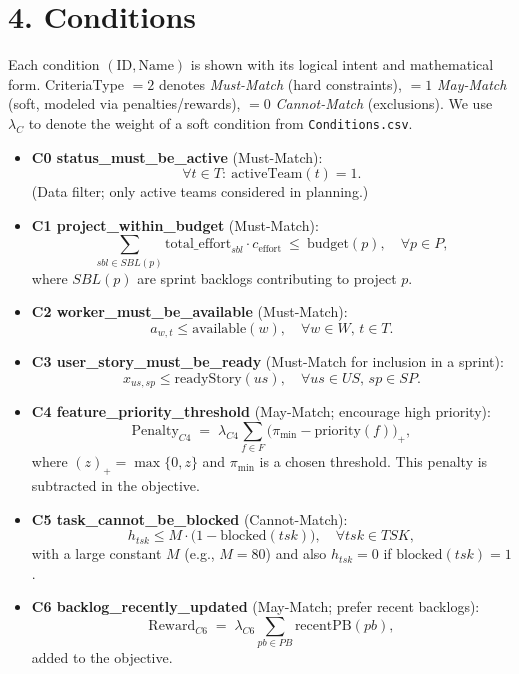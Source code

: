 \documentclass[11pt,a4paper]{article}
\begin{document}
\section{4. Conditions}
Each condition \((\text{ID}, \text{Name})\) is shown with its logical intent and mathematical form. CriteriaType \(=2\) denotes \emph{Must-Match} (hard constraints), \(=1\) \emph{May-Match} (soft, modeled via penalties/rewards), \(=0\) \emph{Cannot-Match} (exclusions). We use \(\lambda_C\) to denote the weight of a soft condition from \texttt{Conditions.csv}.

\begin{itemize}[leftmargin=2em,label=\(\triangleright\)]
  \item \textbf{C0 status\_must\_be\_active} (Must-Match):
  \[
  \forall t \in T:\ \text{activeTeam}(t)=1.
  \]
  (Data filter; only active teams considered in planning.)

  \item \textbf{C1 project\_within\_budget} (Must-Match):
  \[
  \sum_{sbl \in SBL(p)} \text{total\_effort}_{sbl} \cdot c_{\text{effort}} \ \le\ \text{budget}(p),\quad \forall p \in P,
  \]
  where \(SBL(p)\) are sprint backlogs contributing to project \(p\).

  \item \textbf{C2 worker\_must\_be\_available} (Must-Match):
  \[
  a_{w,t} \le \text{available}(w),\quad \forall w \in W,\, t \in T.
  \]

  \item \textbf{C3 user\_story\_must\_be\_ready} (Must-Match for inclusion in a sprint):
  \[
  x_{us,sp} \le \text{readyStory}(us),\quad \forall us \in US,\, sp \in SP.
  \]

  \item \textbf{C4 feature\_priority\_threshold} (May-Match; encourage high priority):
  \[
  \text{Penalty}_{C4} \;=\; \lambda_{C4}\!\!\sum_{f \in F}\! \big(\pi_{\min} - \text{priority}(f)\big)_+,
  \]
  where \((z)_+=\max\{0,z\}\) and \(\pi_{\min}\) is a chosen threshold. This penalty is subtracted in the objective.

  \item \textbf{C5 task\_cannot\_be\_blocked} (Cannot-Match):
  \[
  h_{tsk} \le M \cdot \big(1-\text{blocked}(tsk)\big),\quad \forall tsk \in TSK,
  \]
  with a large constant \(M\) (e.g., \(M=80\)) and also \(h_{tsk}=0\) if \(\text{blocked}(tsk)=1\).

  \item \textbf{C6 backlog\_recently\_updated} (May-Match; prefer recent backlogs):
  \[
  \text{Reward}_{C6} \;=\; \lambda_{C6}\!\!\sum_{pb \in PB}\! \text{recentPB}(pb),
  \]
  added to the objective.


\end{itemize}
\end{document}
